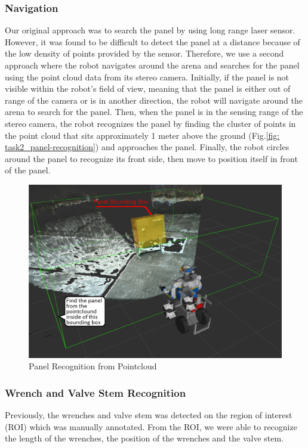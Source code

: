 \subsubsection{Navigation}
Our original approach was to search the panel by using long range
laser sensor. However, it was found to be difficult to detect the panel at a
distance because of the low density of points provided by the sensor.
Therefore, we use a second approach where the robot navigates around
the arena and searches for the panel using the point cloud data from its
stereo camera. Initially, if the panel is not visible within the
robot's field of view, meaning that the panel is either out of range
of the camera or is in another direction, the robot will navigate
around the arena to search for the panel. Then, when the panel is in
the sensing range of the stereo camera, the robot recognizes the panel
by finding the cluster of points in the point cloud that sits
approximately 1 meter above the ground (Fig.\ref{fig:
  task2_panel-recognition}) and approaches the panel. Finally, the
robot circles around the panel to recognize its front side, then move
to position itself in front of the panel.

\begin{figure}[htb]
  \begin{center}
    \includegraphics[width=0.80\columnwidth]{sections/task2/images/panel_detect.png}
    \caption{Panel Recognition from Pointcloud}
    \label{fig: task2_panel-recognition}
  \end{center}
\end{figure}

\subsubsection{Wrench and Valve Stem Recognition}
Previously, the wrenches and valve stem was detected on the region of
interest (ROI) which was manually annotated. From the ROI, we were
able to recognize the length of the wrenches, the position of the
wrenches and the valve stem.

